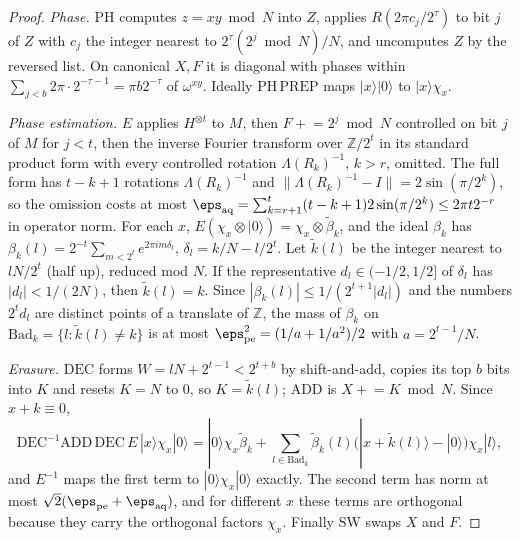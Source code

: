 \begin{proof}
\emph{Phase.} $\mathrm{PH}$ computes $z = xy \bmod N$ into $Z$, applies $R(2\pi c_j/2^\tau)$ to bit $j$ of $Z$ with $c_j$ the integer nearest to $2^\tau(2^j \bmod N)/N$, and uncomputes $Z$ by the reversed list. On canonical $X, F$ it is diagonal with phases within $\sum_{j<b}2\pi\cdot2^{-\tau-1} = \pi b2^{-\tau}$ of $\omega^{xy}$. Ideally $\mathrm{PH}\,\mathrm{PREP}$ maps $|x\rangle|0\rangle$ to $|x\rangle\chi_x$.

\emph{Phase estimation.} $E$ applies $H^{\otimes t}$ to $M$, then $F \mathrel{+}= 2^j \bmod N$ controlled on bit $j$ of $M$ for $j < t$, then the inverse Fourier transform over $\mathbb{Z}/2^t$ in its standard product form with every controlled rotation $\Lambda(R_k)^{-1}$, $k > r$, omitted. The full form has $t - k + 1$ rotations $\Lambda(R_k)^{-1}$ and $\|\Lambda(R_k)^{-1} - I\| = 2\sin(\pi/2^k)$, so the omission costs at most $\eps_{\mathrm{aq}} = \sum_{k=r+1}^t(t-k+1)2\sin(\pi/2^k) \le 2\pi t2^{-r}$ in operator norm. For each $x$, $E(\chi_x\otimes|0\rangle) = \chi_x\otimes\tilde\beta_k$, and the ideal $\beta_k$ has $\beta_k(l) = 2^{-t}\sum_{m<2^t}e^{2\pi i m\delta_l}$, $\delta_l = k/N - l/2^t$. Let $\tilde k(l)$ be the integer nearest to $lN/2^t$ (half up), reduced mod $N$. If the representative $d_l \in (-1/2, 1/2]$ of $\delta_l$ has $|d_l| < 1/(2N)$, then $\tilde k(l) = k$. Since $|\beta_k(l)| \le 1/(2^{t+1}|d_l|)$ and the numbers $2^td_l$ are distinct points of a translate of $\mathbb{Z}$, the mass of $\beta_k$ on $\mathrm{Bad}_k = \{l : \tilde k(l) \ne k\}$ is at most $\eps_{\mathrm{pe}}^2 = (1/a + 1/a^2)/2$ with $a = 2^{t-1}/N$.

\emph{Erasure.} $\mathrm{DEC}$ forms $W = lN + 2^{t-1} < 2^{t+b}$ by shift-and-add, copies its top $b$ bits into $K$ and resets $K = N$ to $0$, so $K = \tilde k(l)$; $\mathrm{ADD}$ is $X \mathrel{+}= K \bmod N$. Since $x + k \equiv 0$,
\[
  \mathrm{DEC}^{-1}\mathrm{ADD}\,\mathrm{DEC}\,E\,|x\rangle\chi_x|0\rangle = |0\rangle\chi_x\tilde\beta_k + \sum_{l\in\mathrm{Bad}_k}\tilde\beta_k(l)\bigl(|x+\tilde k(l)\rangle - |0\rangle\bigr)\chi_x|l\rangle ,
\]
and $E^{-1}$ maps the first term to $|0\rangle\chi_x|0\rangle$ exactly. The second term has norm at most $\sqrt2(\eps_{\mathrm{pe}} + \eps_{\mathrm{aq}})$, and for different $x$ these terms are orthogonal because they carry the orthogonal factors $\chi_x$. Finally $\mathrm{SW}$ swaps $X$ and $F$.


\end{proof}
